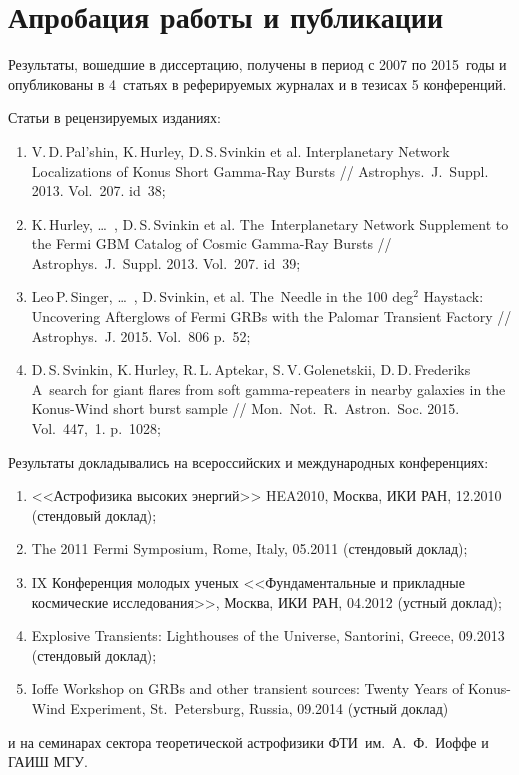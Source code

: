 \section*{Апробация работы и публикации}
Результаты, вошедшие в диссертацию, получены в период с 2007 по 2015~годы и 
опубликованы в 4~статьях в реферируемых журналах и в тезисах 5 конференций. 

Статьи в рецензируемых изданиях:
\begin{enumerate}
\item V.\,D.\,Pal'shin, K.\,Hurley, D.\,S.\,Svinkin et al. Interplanetary Network Localizations of
Konus Short Gamma-Ray Bursts // Astrophys.~J.~Suppl. 2013. Vol.~207. id~38;
\item K.\,Hurley, \dots\ , D.\,S.\,Svinkin et al. The~Interplanetary Network Supplement to 
the Fermi GBM Catalog of Cosmic Gamma-Ray Bursts // Astrophys.~J.~Suppl. 2013. Vol.~207. id~39;
\item Leo\,P.\,Singer, \dots\ , D.\,Svinkin, et al. The~Needle in the 100 deg$^2$ Haystack: 
Uncovering Afterglows of Fermi GRBs with the Palomar Transient Factory // 
Astrophys.~J. 2015. Vol.~806 p.~52;
\item D.\,S.\,Svinkin, K.\,Hurley, R.\,L.\,Aptekar, S.\,V.\,Golenetskii, D.\,D.\,Frederiks 
A~search for giant flares from soft gamma-repeaters in nearby galaxies in the 
Konus-Wind short burst sample // Mon.~Not.~R.~Astron.~Soc. 2015. Vol.~447,~1. p.~1028;

\end{enumerate}

Результаты докладывались на всероссийских и международных конференциях: 
\begin{enumerate}
\item <<Астрофизика высоких энергий>> HEA2010, Москва, ИКИ РАН, 12.2010 (стендовый доклад);
\item The 2011 Fermi Symposium, Rome, Italy, 05.2011 (стендовый доклад);
\item IX Конференция молодых ученых <<Фундаментальные и прикладные космические исследования>>, 
    Москва, ИКИ РАН, 04.2012 (устный доклад);
\item Explosive Transients: Lighthouses of the Universe, Santorini, Greece, 09.2013 (стендовый доклад);
\item Ioffe Workshop on GRBs and other transient sources: Twenty Years of Konus-Wind Experiment, 
    St.~Petersburg, Russia, 09.2014 (устный доклад)
\end{enumerate}
и на семинарах сектора теоретической астрофизики ФТИ~им.~А.~Ф.~Иоффе и ГАИШ МГУ.


